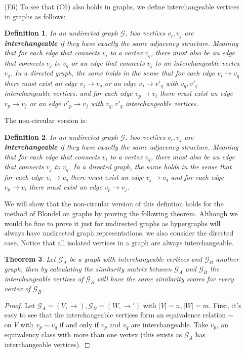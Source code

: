 \documentclass[a4paper,11pt]{report}
\newtheorem{theorem}{Theorem}[section]
\newtheorem{definition}[theorem]{Definition}
\newcommand{\graf}{\mathscr{G}}
\begin{document}
\begin{itemize}
  \item[(E6)]  To see that (C6) also holds in graphs, we define interchangeable vertices in graphs 
  as follows:
  \begin{definition} In an undirected graph $\graf$, two vertices $v_i, v_j$ are \textbf{interchangeable} if they have exactly the same 
  adjacency structure. Meaning that for each edge that connects $v_i$ to a vertex $v_q$, there must also 
  be an edge that connects $v_j$ to $v_q$ or an edge that connects $v_j$ to an interchangeable vertex $v_q$.  In a directed graph, the same holds 
  in the sense that for each edge $v_i \to v_q$ there must exist an edge $v_j \to v_q$  
 or an edge $v_j \to v'_q$ with $v_q, v'_q$ interchangeable vertices.
  and for each edge $v_p \to v_i$ there must exist an edge $v_p \to v_j$ or an edge $v'_p \to v_j$ with $v_q, v'_q$ interchangeable vertices.
  \end{definition}
  The non-circular version is:
    \begin{definition} In an undirected graph $\graf$, two vertices $v_i, v_j$ are \textbf{interchangeable} if they have exactly the same 
  adjacency structure. Meaning that for each edge that connects $v_i$ to a vertex $v_q$, there must also 
  be an edge that connects $v_j$ to $v_q$.  In a directed graph, the same holds 
  in the sense that for each edge $v_i \to v_q$ there must exist an edge $v_j \to v_q$ 
  and for each edge $v_p \to v_i$ there must exist an edge $v_p \to v_j$.
  \end{definition}
  We will show that the non-circular version of this defintion  holds for the method of Blondel on graphs by proving the 
  following theorem. Although we would be fine to prove it just for undirected graphs as hypergraphs
  will always have undirected graph representations, we also consider the 
  directed case. Notice that all isolated vertices in a graph are always 
  interchangeable.
 \begin{theorem}
    Let $\graf_A$ be a graph with interchangeable vertices and $\graf_B$ another 
    graph, then by calculating the similarity matrix between $\graf_A$ and 
    $\graf_B$ the interchangeable vertices of $\graf_A$ will have the same similarity scores for every vertex of $\graf_B$. 
  \end{theorem}
  \begin{proof}
    Let $\graf_A = (V,\to), \graf_B = (W,\to')$ with $|V|=n, |W|=m$. First, it's easy to see that the interchangeable vertices form an equivalence relation $\sim$ on 
    $V$ with $v_p \sim v_q$ if and only if $v_p$ and $v_q$ are interchangeable. 
    Take $\overline{v_p}$, an equivalency class with more than one vertex (this exists as $\graf_A$ has interchangeable 
    vertices).  
    

\end{proof}
\end{itemize}
\end{document}
